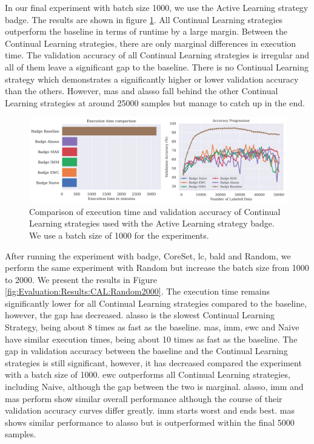 In our final experiment with batch size 1000, we use the Active Learning strategy \gls{badge}. The results are shown in figure \ref{fig:Evaluation:Results:CAL:Badge1000}. All Continual Learning strategies
outperform the baseline in terms of runtime by a large margin. Between the Continual Learning strategies, there are only marginal differences in execution time. The validation accuracy of all Continual
Learning strategies is irregular and all of them leave a significant gap to the baseline. There is no Continual Learning strategy which demonstrates a significantly higher or lower validation accuracy
than the others. However, \gls{mas} and \gls{alasso} fall behind the other Continual Learning strategies at around 25000 samples but manage to catch up in the end. \par

\begin{figure}[h]
    \centering
    \includegraphics[width=\linewidth]{images/results_CAL/Badge_CAL_1000b.png}
    \caption[Continual Active Learning \gls{badge} 1000 batch size]{Comparison of execution time and validation accuracy of Continual Learning strategies used with the Active Learning strategy
    \gls{badge}. We use a batch size of 1000 for the experiments. }
    \label{fig:Evaluation:Results:CAL:Badge1000}
\end{figure}

After running the experiment with \gls{badge}, CoreSet, \gls{lc}, \gls{bald} and Random, we perform the same experiment with Random but increase the batch size from 1000 to 2000. We present the results in
Figure \ref{fig:Evaluation:Results:CAL:Random2000}. The execution time remains significantly lower for all Continual Learning strategies compared to the baseline, however, the gap has decreased. 
\gls{alasso} is the slowest Continual Learning Strategy, being about 8 times as fast as the baseline. \gls{mas}, \gls{imm}, \gls{ewc} and Naive have similar execution times, being about 10 times as fast as the baseline. 
The gap in validation accuracy between the baseline and the Continual Learning strategies is still significant, however, it has decreased compared the experiment with a batch size of 1000.
\gls{ewc} outperforms all Continual Learning strategies, including Naive, although the gap between the two is marginal. \gls{alasso}, \gls{imm} and \gls{mas} perform show similar overall performance although the course
of their validation accuracy curves differ greatly. \gls{imm} starts worst and ends best. \gls{mas} shows similar performance to \gls{alasso} but is outperformed within the final 5000 samples. \par

